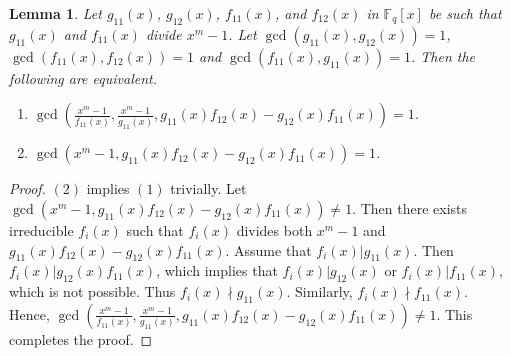 \documentclass[12 pt]{extarticle}
\numberwithin{equation}{section}
\newtheorem{lemma}[theorem]{Lemma}
\theoremstyle{definition}
\begin{document}
\begin{lemma}\label{gen1lemma}
    Let $g_{11}(x)$, $g_{12}(x)$, $f_{11}(x)$, and $f_{12}(x)$ in $\mathbb{F}_q[x]$ be such that  $g_{11}(x)$ and $f_{11}(x)$ divide $x^m-1$. Let $\gcd(g_{11}(x),g_{12}(x))=1$, $\gcd(f_{11}(x),f_{12}(x))=1$ and $\gcd(f_{11}(x),g_{11}(x))=1$. Then the following are equivalent.
    \begin{enumerate}[(1)]
        \item $\gcd\left (\frac{x^m-1}{f_{11}(x)},\frac{x^m-1}{g_{11}(x)},g_{11}(x)f_{12}(x)-g_{12}(x)f_{11}(x)\right )=1$.
        \item $\gcd(x^m-1,g_{11}(x)f_{12}(x)-g_{12}(x)f_{11}(x) )=1$.
    \end{enumerate}
\end{lemma}
\begin{proof}
    $(2)$ implies $(1)$ trivially. Let $\gcd(x^m-1,g_{11}(x)f_{12}(x)-g_{12}(x)f_{11}(x) )\neq 1$. Then there exists irreducible $f_i(x)$ such that $f_i(x)$ divides both $x^m-1$ and $g_{11}(x)f_{12}(x)-g_{12}(x)f_{11}(x)$. Assume that $f_i(x)|g_{11}(x)$. Then $f_i(x)|g_{12}(x)f_{11}(x)$, which implies that $f_i(x)|g_{12}(x)$ or $f_i(x)|f_{11}(x)$, which is not possible. Thus $f_i(x)\nmid g_{11}(x)$. Similarly, $f_i(x)\nmid f_{11}(x)$. Hence, $\gcd\left (\frac{x^m-1}{f_{11}(x)},\frac{x^m-1}{g_{11}(x)},g_{11}(x)f_{12}(x)-g_{12}(x)f_{11}(x)\right )\neq 1$. This completes the proof.   
\end{proof}
\end{document}
